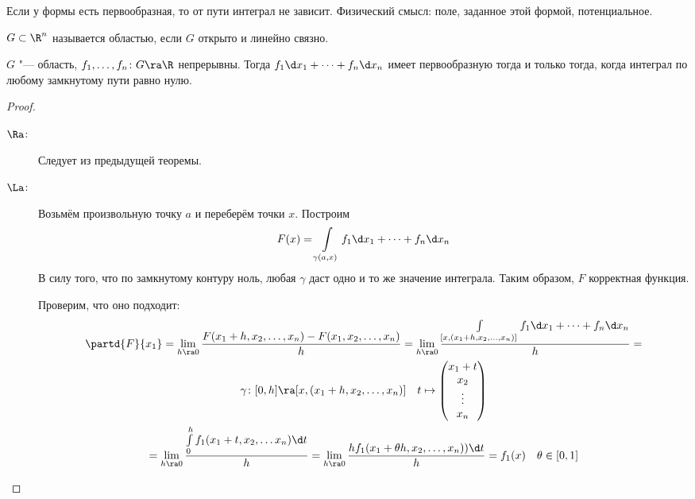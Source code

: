 \begin{conseq}
	Если у формы есть первообразная, то от пути интеграл не зависит.
	Физический смысл: поле, заданное этой формой, потенциальное.
\end{conseq}

\begin{Def}
	$G \subset \R^n$ называется областью, если $G$ открыто и линейно связно.
\end{Def}

\begin{theorem}
	$G$ "--- область, $f_1, \dots, f_n\colon G \ra \R$ непрерывны.
	Тогда $f_1 \d x_1 + \dots + f_n \d x_n$ имеет первообразную тогда и только тогда,
	когда интеграл по любому замкнутому пути равно нулю.
\end{theorem}
\begin{proof}
	\begin{description}
	\item[$\Ra$:]
		Следует из предыдущей теоремы.

	\item[$\La$:]
		Возьмём произвольную точку $a$ и переберём точки $x$.
		Построим
		\[ F(x) = \int\limits_{\gamma(a, x)} f_1 \d x_1 + \dots + f_n \d x_n \]
		В силу того, что по замкнутому контуру ноль, любая $\gamma$ даст одно и то же значение интеграла.
		Таким образом, $F$ корректная функция.

		Проверим, что оно подходит:
		\begin{gather*}
			\partd{F}{x_1} = \lim_{h \ra 0} \frac{F(x_1 + h, x_2, \dots, x_n) - F(x_1, x_2, \dots, x_n)}h
			= \lim_{h \ra 0} \frac{\int\limits_{[x, (x_1 + h, x_2, \dots, x_n)]} f_1 \d x_1 + \dots + f_n \d x_n}h = \\
			\gamma\colon [0, h] \ra [x, (x_1 + h, x_2, \dots, x_n)] \quad t \mapsto \begin{pmatrix} x_1 + t\\x_2\\\vdots\\x_n\end{pmatrix} \\
			= \lim_{h \ra 0} \frac{\int\limits_0^h f_1(x_1+t, x_2, \dots x_n) \d t}h
			= \lim_{h \ra 0} \frac{h f_1(x_1 + \theta h, x_2, \dots, x_n)) \d t}h = f_1(x) \quad \theta \in [0, 1]
		\end{gather*}
	\end{description}
\end{proof}

